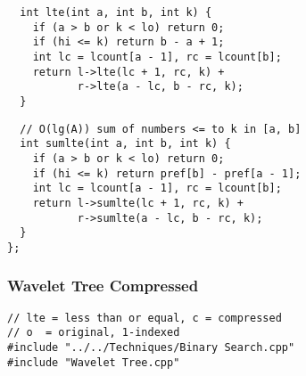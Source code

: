 \documentclass[twoside]{article}
\begin{document}
\begin{multicols*}{2}
\begin{verbatim}
  int lte(int a, int b, int k) {
    if (a > b or k < lo) return 0;
    if (hi <= k) return b - a + 1;
    int lc = lcount[a - 1], rc = lcount[b];
    return l->lte(lc + 1, rc, k) +
           r->lte(a - lc, b - rc, k);
  }
\end{verbatim}
\vspace{-12pt}
\begin{verbatim}
  // O(lg(A)) sum of numbers <= to k in [a, b]
  int sumlte(int a, int b, int k) {
    if (a > b or k < lo) return 0;
    if (hi <= k) return pref[b] - pref[a - 1];
    int lc = lcount[a - 1], rc = lcount[b];
    return l->sumlte(lc + 1, rc, k) +
           r->sumlte(a - lc, b - rc, k);
  }
};
\end{verbatim}

\subsubsectionfont{\large\bfseries\sffamily\underline}
\subsubsection*{Wavelet Tree Compressed}
\begin{verbatim}
// lte = less than or equal, c = compressed
// o  = original, 1-indexed
#include "../../Techniques/Binary Search.cpp"
#include "Wavelet Tree.cpp"


\end{verbatim}
\end{multicols*}
\end{document}
